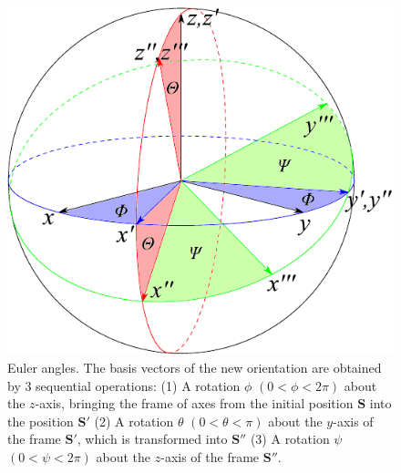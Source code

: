 \begin{enumerate}
\begin{figure}[h]
\begin{centering}
\includegraphics[scale=0.7]{_figure/euler_sphere}
\par\end{centering}
\caption[Euler angles]{Euler angles. The basis vectors of the new orientation are obtained
by 3 sequential operations: (1) A rotation $\phi$ $(0<\phi<2\pi)$
about the $z$-axis, bringing the frame of axes from the initial position
$\mathbf{S}$ into the position $\mathbf{S}'$ (2) A rotation $\theta$
$(0<\theta<\pi)$ about the $y$-axis of the frame $\mathbf{S}'$,
which is transformed into $\mathbf{S}''$ (3) A rotation $\psi$ $(0<\psi<2\pi)$
about the $z$-axis of the frame $\mathbf{S}''$.\label{fig:Euler-angles}}
\end{figure}


\end{enumerate}
